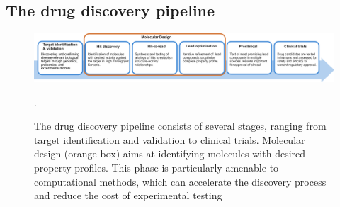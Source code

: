 \subsection{The drug discovery pipeline}
\begin{figure}
      \centering
      \includegraphics[width=\textwidth]{figures/drug-discovery-pipeline_v2.pdf}
      \caption{The drug discovery pipeline consists of several stages, ranging from target identification
            and validation to clinical trials. Molecular design (orange box) aims at identifying
            molecules with desired property profiles. This phase is particularly amenable to
            computational methods, which can accelerate the discovery process and reduce the cost of
            experimental testing\label{fig:drug-discovery-pipeline}}.
\end{figure}


